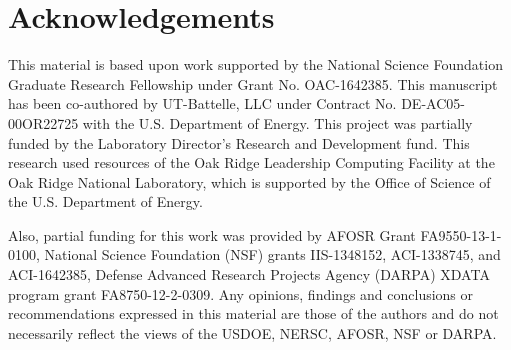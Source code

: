 \section{Acknowledgements}
\small

This material is based upon work supported by the National Science Foundation Graduate Research Fellowship under Grant No. OAC-1642385.
This manuscript has been co-authored by UT-Battelle, LLC under Contract No. DE-AC05-00OR22725 with the U.S. Department of Energy.  This project was partially funded by the Laboratory Director's Research and Development fund. This research used resources of the Oak Ridge Leadership Computing Facility at the Oak Ridge National Laboratory, which is supported by the Office of Science of the U.S. Department of Energy.


Also, partial funding for this work was provided by AFOSR Grant FA9550-13-1-0100, National Science Foundation (NSF) grants IIS-1348152, ACI-1338745, and ACI-1642385, Defense Advanced Research Projects Agency (DARPA) XDATA program grant FA8750-12-2-0309.
 Any opinions, findings and conclusions or recommendations expressed in this material are those of the authors and do not necessarily reflect the views of the USDOE, NERSC, AFOSR, NSF or DARPA.
 
 \normalsize
 
